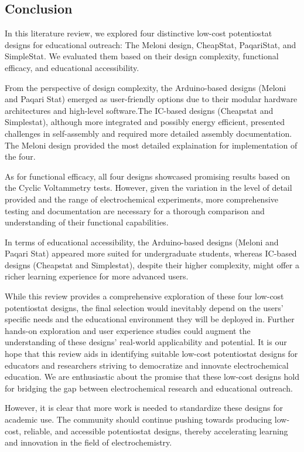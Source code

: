 \documentclass{article}
\begin{document}
\subsection*{Conclusion}

In this literature review, we explored four distinctive low-cost potentiostat designs for educational outreach: The Meloni design, CheapStat, PaqariStat, and SimpleStat. We evaluated them based on their design complexity, functional efficacy, and educational accessibility.

From the perspective of design complexity, the Arduino-based designs (Meloni and Paqari Stat) emerged as user-friendly options due to their modular hardware architectures and high-level software.The IC-based designs (Cheapstat and Simplestat), although more integrated and possibly energy efficient, presented challenges in self-assembly and required more detailed assembly documentation. The Meloni design provided the most detailed explaination for implementation of the four. 

As for functional efficacy, all four designs showcased promising results based on the Cyclic Voltammetry tests. However, given the variation in the level of detail provided and the range of electrochemical experiments, more comprehensive testing and documentation are necessary for a thorough comparison and understanding of their functional capabilities.

In terms of educational accessibility, the Arduino-based designs (Meloni and Paqari Stat) appeared more suited for undergraduate students, whereas IC-based designs (Cheapstat and Simplestat), despite their higher complexity, might offer a richer learning experience for more advanced users.

While this review provides a comprehensive exploration of these four low-cost potentiostat designs, the final selection would inevitably depend on the users' specific needs and the educational environment they will be deployed in. Further hands-on exploration and user experience studies could augment the understanding of these designs' real-world applicability and potential. It is our hope that this review aids in identifying suitable low-cost potentiostat designs for educators and researchers striving to democratize and innovate electrochemical education. We are enthusiastic about the promise that these low-cost designs hold for bridging the gap between electrochemical research and educational outreach.

However, it is clear that more work is needed to standardize these designs for academic use. The community should continue pushing towards producing low-cost, reliable, and accessible potentiostat designs, thereby accelerating learning and innovation in the field of electrochemistry.
\end{document}
